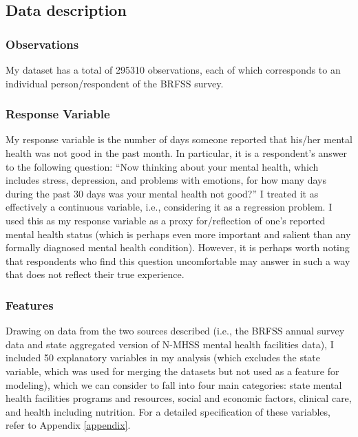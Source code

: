 \documentclass[
]{article}
\begin{document}
\hypertarget{data-description}{%
\subsection{Data description}\label{data-description}}

\hypertarget{observations}{%
\subsubsection{Observations}\label{observations}}

My dataset has a total of 295310 observations, each of which corresponds to an individual person/respondent of the BRFSS survey.

\hypertarget{response-variable}{%
\subsubsection{Response Variable}\label{response-variable}}

My response variable is the number of days someone reported that his/her mental health was not good in the past month. In particular, it is a respondent's answer to the following question: ``Now thinking about your mental health, which includes stress, depression, and problems with emotions, for how many days during the past 30 days was your mental health not good?'' I treated it as effectively a continuous variable, i.e., considering it as a regression problem. I used this as my response variable as a proxy for/reflection of one's reported mental health status (which is perhaps even more important and salient than any formally diagnosed mental health condition). However, it is perhaps worth noting that respondents who find this question uncomfortable may answer in such a way that does not reflect their true experience.

\hypertarget{features}{%
\subsubsection{Features}\label{features}}

Drawing on data from the two sources described (i.e., the BRFSS annual survey data and state aggregated version of N-MHSS mental health facilities data), I included 50 explanatory variables in my analysis (which excludes the state variable, which was used for merging the datasets but not used as a feature for modeling), which we can consider to fall into four main categories: state mental health facilities programs and resources, social and economic factors, clinical care, and health including nutrition. For a detailed specification of these variables, refer to Appendix \ref{appendix}.
\end{document}
